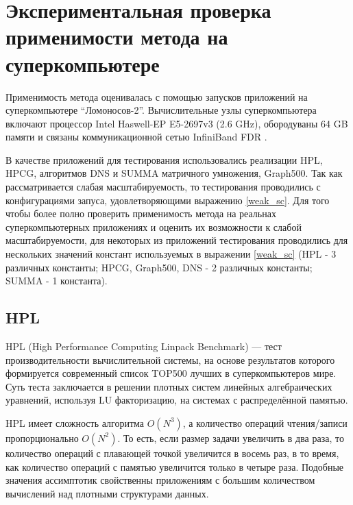 \chapter{Экспериментальная проверка применимости метода на суперкомпьютере}
	Применимость метода оценивалась с помощью запусков приложений на суперкомпьютере “Ломоносов-2”. Вычислительные узлы суперкомпьютера включают процессор Intel Haswell-EP E5-2697v3 (2.6 GHz), обородуваны 64 GB памяти и связаны коммуникационной сетью InfiniBand FDR \cite{Lom2_stat}.

	В качестве приложений для тестирования использовались реализации HPL, HPCG, алгоритмов DNS и SUMMA матричного умножения, Graph500. Так как рассматривается слабая масштабируемость, то тестирования проводились с конфигурациями запуса, удовлетворяющими выражению \ref{weak_sc}. Для того чтобы более полно проверить применимость метода на реальнах суперкомпьютерных приложениях и оценить их возможности к слабой масштабируемости, для некоторых из приложений тестирования проводились для нескольких значений констант используемых в выражении \ref{weak_sc} (HPL - 3 различных константы; HPCG, Graph500, DNS - 2 различных константы; SUMMA - 1 константа).



	\section{HPL}

	HPL (High Performance Computing Linpack Benchmark) — тест производительности вычислительной системы, на основе результатов которого формируется современный список TOP500 \cite{top500} лучших в суперкомпьютеров мире. Суть теста заключается в решении плотных систем линейных алгебраических уравнений, используя LU факторизацию, на системах с распределённой памятью.

	HPL имеет сложность алгоритма \(O(N^3)\), а количество операций чтения/записи пропорционально \(O(N^2)\). То есть, если размер задачи увеличить в два раза, то количество операций с плавающей точкой увеличится в восемь раз, в то время, как количество операций с памятью увеличится только в четыре раза. Подобные значения ассимптотик свойственны приложениям с большим количеством вычислений над плотными структурами данных.

